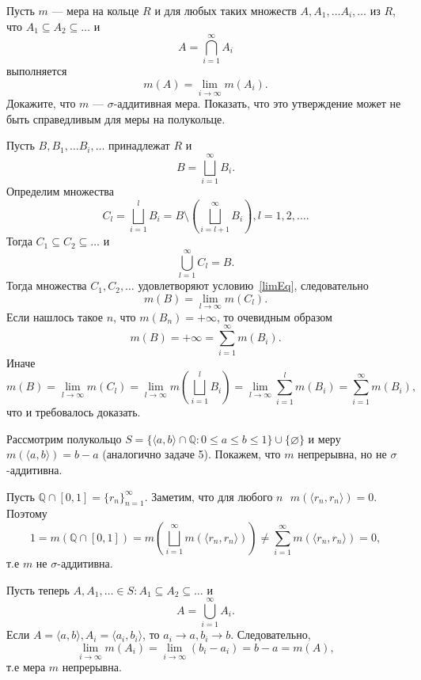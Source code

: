 \begin{task}{8}
Пусть $m$ --- мера на кольце $R$ и для любых таких множеств 
$A, A_1, \dots A_i, \dots$ из $R$, что $A_1 \subseteq A_2 \subseteq \dots$ и
$$A = \bigcap_{i=1}^{\infty} A_i$$
выполняется 
\begin{equation}\label{limEq}
    m(A) = \lim_{i \to \infty} m(A_i).
\end{equation}
Докажите, что $m$ --- $\sigma$-аддитивная мера. Показать, что это утверждение может не быть справедливым для меры на полукольце.
\end{task}

\begin{solution}
Пусть $B, B_1, \dots B_i, \dots$ принадлежат $R$ и 
$$B = \bigsqcup_{i=1}^{\infty} B_i.$$ Определим множества
$$ C_l = \bigsqcup_{i=1}^{l} B_i = B \setminus \left(\bigsqcup_{i = l+1}^{\infty} B_i \right), l = 1, 2, \dots.$$
Тогда $C_1 \subseteq C_2 \subseteq \dots$ и
$$ \bigcup_{l=1}^{\infty} C_l = B.$$
Тогда множества $C_1, C_2, \dots$ удовлетворяют условию~\eqref{limEq}, следовательно
$$m(B) = \lim_{l \to \infty} m(C_l).$$
Если нашлось такое $n$, что $m(B_n) = +\infty$, то очевидным образом 
$$m(B) = +\infty = \sum_{i=1}^{\infty} m(B_i).$$
Иначе
$$ m(B) = \lim_{l \to \infty} m(C_l) = \lim_{l \to \infty} m\left( \bigsqcup_{i=1}^{l} B_i \right) = \lim_{l \to \infty} \sum_{i=1}^{l} m(B_i) = \sum_{i=1}^{\infty} m(B_i),$$ что и требовалось доказать.

Рассмотрим полукольцо $S = \{\langle a, b \rangle \cap \mathbb{Q}: 0 \leqslant a \leqslant b \leqslant 1\} \cup \{\varnothing\}$ и меру $m(\langle a, b \rangle) = b - a$ (аналогично задаче 5). Покажем, что $m$ непрерывна, но не $\sigma$-аддитивна.

Пусть $\mathbb{Q} \cap [0, 1] = \{r_n\}_{n=1}^{\infty}$. Заметим, что для любого $n \text{ } m(\langle r_n, r_n \rangle) = 0$. Поэтому
$$ 1 = m(\mathbb{Q} \cap [0, 1]) = m\left(\bigsqcup_{i=1}^{\infty} m(\langle r_n, r_n \rangle) \right) \neq \sum_{i=1}^{\infty} m(\langle r_n, r_n \rangle) = 0,$$
т.е $m$ не $\sigma$-аддитивна.

Пусть теперь $A, A_1, \dots \in S: A_1 \subseteq A_2 \subseteq \dots$ и
$$ A = \bigcup_{i=1}^{\infty} A_i.$$
Если $A = \langle a, b \rangle, A_i = \langle a_i, b_i \rangle$, то $a_i \to a, b_i \to b$. Следовательно,
$$\lim_{i \to \infty} m(A_i) = \lim_{i \to \infty} (b_i - a_i) = b - a = m(A),$$
т.е мера $m$ непрерывна.
\end{solution}